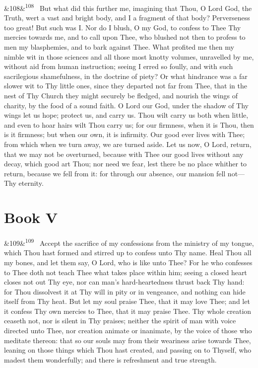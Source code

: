 \documentclass[12pt]{article}
\newcommand{\para}[1][]{\par\noindent\ifx&#1&\else\textsuperscript{\footnotesize #1}~\fi}
\begin{document}
\para[108] But what did this further me, imagining that Thou, O Lord God, the Truth, wert a vast and bright body, and I a fragment of that body? Perverseness too great! But such was I. Nor do I blush, O my God, to confess to Thee Thy mercies towards me, and to call upon Thee, who blushed not then to profess to men my blasphemies, and to bark against Thee. What profited me then my nimble wit in those sciences and all those most knotty volumes, unravelled by me, without aid from human instruction; seeing I erred so foully, and with such sacrilegious shamefulness, in the doctrine of piety? Or what hindrance was a far slower wit to Thy little ones, since they departed not far from Thee, that in the nest of Thy Church they might securely be fledged, and nourish the wings of charity, by the food of a sound faith. O Lord our God, under the shadow of Thy wings let us hope; protect us, and carry us. Thou wilt carry us both when little, and even to hoar hairs wilt Thou carry us; for our firmness, when it is Thou, then is it firmness; but when our own, it is infirmity. Our good ever lives with Thee; from which when we turn away, we are turned aside. Let us now, O Lord, return, that we may not be overturned, because with Thee our good lives without any decay, which good art Thou; nor need we fear, lest there be no place whither to return, because we fell from it: for through our absence, our mansion fell not---Thy eternity.

\section*{Book V}

\para[109] Accept the sacrifice of my confessions from the ministry of my tongue, which Thou hast formed and stirred up to confess unto Thy name. Heal Thou all my bones, and let them say, O Lord, who is like unto Thee? For he who confesses to Thee doth not teach Thee what takes place within him; seeing a closed heart closes not out Thy eye, nor can man's hard-heartedness thrust back Thy hand: for Thou dissolvest it at Thy will in pity or in vengeance, and nothing can hide itself from Thy heat. But let my soul praise Thee, that it may love Thee; and let it confess Thy own mercies to Thee, that it may praise Thee. Thy whole creation ceaseth not, nor is silent in Thy praises; neither the spirit of man with voice directed unto Thee, nor creation animate or inanimate, by the voice of those who meditate thereon: that so our souls may from their weariness arise towards Thee, leaning on those things which Thou hast created, and passing on to Thyself, who madest them wonderfully; and there is refreshment and true strength.
\end{document}
